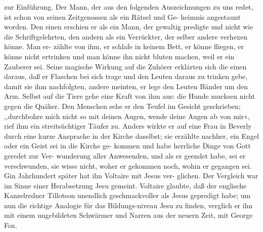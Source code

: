 zur Einführung.
Der Mann, der aus den folgenden Auszeichnungen zu uns
redet, ist schon von seinen Zeitgenossen als ein Rätsel und Ge-
heimnis angestaunt worden. Den einen erschien er als ein Mann,
der gewaltig predigte und nicht wie die Schriftgelehrten, den andern
als ein Verrückter, der selber andere verhexen könne. Man er-
zählte von ihm, er schlafe in keinem Bett, er könne fliegen, er
könne nicht ertrinken und man könne ihn nicht bluten machen,
weil er ein Zauberer sei. Seine magische Wirkung auf die
Zuhörer erklärten sich die einen daraus, daß er Flaschen bei sich
trage und den Leuten daraus zu trinken gebe, damit sie ihm
nachfolgten, andere meinten, er lege den Leuten Bänder um den Arm.
Selbst auf die Tiere gehe eine Kraft von ihm aus: die Hunde
mucksen nicht gegen die Quäker. Den Menschen sehe er den
Teufel im Gesicht geschrieben; ,,durchbohre mich nicht so mit
deinen Augen, wende deine Augen ab von mir«, rief ihm ein
streitsüchtiger Täufer zu. Anders wirkte er auf eine Frau in
Beverly durch eine kurze Ansprache in der Kirche daselbst; sie
erzählte nachher, ein Engel oder ein Geist sei in die Kirche ge-
kommen und habe herrliche Dinge von Gott geredet zur Ver-
wunderung aller Anwesenden, und als er geendet habe, sei er
verschwunden, sie wisse nicht, woher er gekommen noch, wohin er
gegangen sei.
Gin Jahrhundert später hat ihn Voltaire mit Jesus ver-
glichen. Der Vergleich war im Sinne einer Herabsetzung Jesu
gemeint. Voltaire glaubte, daß der englische Kanzelredner Tillotson
unendlich geschmackvoller als Jesus gepredigt habe; um nun die
richtige Analogie für das Bildungs-niveau Jesu zu finden, verglich
er ihn mit einem ungebildeten Schwärmer und Narren aus der
neuern Zeit, mit George Fox.





